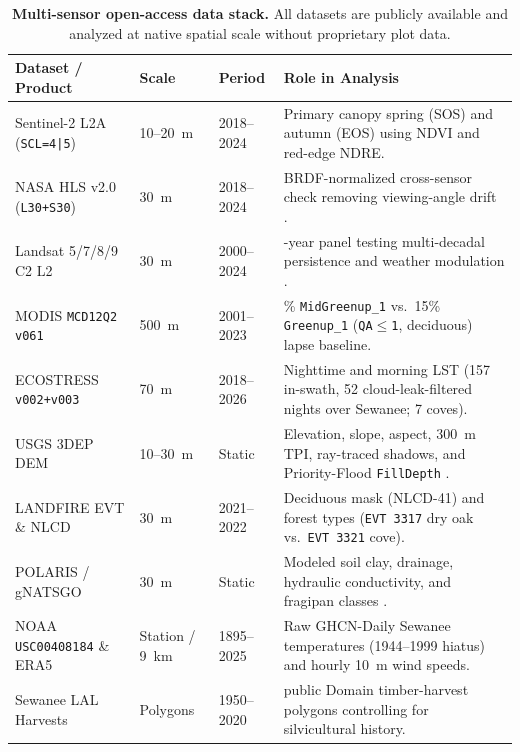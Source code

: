 \begin{table}[t]
\centering
\begin{threeparttable}
\caption{\textbf{Multi-sensor open-access data stack.} All datasets are publicly available and analyzed at native spatial scale without proprietary plot data.}
\label{tab:data_guide}
\footnotesize
\begin{tabularx}{\linewidth}{@{} l l l >{\raggedright\arraybackslash}X @{}}
\toprule
Dataset / Product & Scale & Period & Role in Analysis \\
\midrule
Sentinel-2 L2A (\texttt{SCL=4|5}) & 10--20~m & 2018--2024 & Primary canopy spring (SOS) and autumn (EOS) using NDVI and red-edge NDRE. \\
NASA HLS v2.0 (\texttt{L30+S30}) & 30~m & 2018--2024 & BRDF-normalized cross-sensor check removing viewing-angle drift \citep{claverie2018}. \\
Landsat 5/7/8/9 C2 L2 & 30~m & 2000--2024 & 25-year panel testing multi-decadal persistence and weather modulation \citep{roy2016}. \\
MODIS \texttt{MCD12Q2 v061} & 500~m & 2001--2023 & 50\% \texttt{MidGreenup\_1} vs.\ 15\% \texttt{Greenup\_1} (\texttt{QA$\le$1}, deciduous) lapse baseline. \\
ECOSTRESS \texttt{v002+v003} & 70~m & 2018--2026 & Nighttime and morning LST (157 in-swath, 52 cloud-leak-filtered nights over Sewanee; 7 coves). \\
USGS 3DEP DEM & 10--30~m & Static & Elevation, slope, aspect, 300~m TPI, ray-traced shadows, and Priority-Flood \texttt{FillDepth} \citep{barnes2014}. \\
LANDFIRE EVT \& NLCD & 30~m & 2021--2022 & Deciduous mask (NLCD-41) and forest types (\texttt{EVT 3317} dry oak vs.\ \texttt{EVT 3321} cove). \\
POLARIS / gNATSGO & 30~m & Static & Modeled soil clay, drainage, hydraulic conductivity, and fragipan classes \citep{chaney2019}. \\
NOAA \texttt{USC00408184} \& ERA5 & Station / 9~km & 1895--2025 & Raw GHCN-Daily Sewanee temperatures (1944--1999 hiatus) and hourly 10~m wind speeds. \\
Sewanee LAL Harvests & Polygons & 1950--2020 & 120 public Domain timber-harvest polygons controlling for silvicultural history. \\
\bottomrule
\end{tabularx}
\end{threeparttable}
\end{table}

